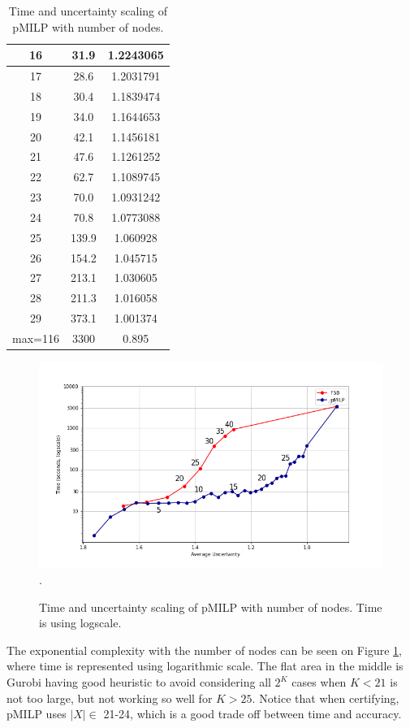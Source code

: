 \begin{table}[h!]
\begin{subtable}[b]{0.45\textwidth}
\begin{tabular}{|c|c|c|}
		\hline	16 & 31.9 & 1.2243065\\
		\hline	17 & 28.6 & 1.2031791\\
		\hline	18 & 30.4 & 1.1839474\\
		\hline	19 & 34.0 & 1.1644653\\
		\hline	20 & 42.1 & 1.1456181\\
		\hline	21 & 47.6 & 1.1261252\\
		\hline	22 & 62.7 & 1.1089745\\
		\hline	23 & 70.0 & 1.0931242\\
		\hline	24 & 70.8 & 1.0773088\\
		\hline	25 & 139.9 & 1.060928\\
		\hline	26 & 154.2 & 1.045715\\
		\hline	27 & 213.1 & 1.030605 \\
		\hline	28 & 211.3 & 1.016058\\
		\hline	29 & 373.1 & 1.001374\\
		\hline max=116 & 3300 & 0.895\\ 
		\hline		
	  \end{tabular}
     \end{subtable}
	  \caption{Time and uncertainty scaling of pMILP with number of nodes.}
    	\label{table14}
\end{table}


\begin{figure}[b!]
	\hspace*{-0.8cm}
	\includegraphics[scale=0.6]{Layer3_comparison}.
	\caption{Time and uncertainty scaling of pMILP with number of nodes.
	Time is using logscale.}
	\label{fig3}
\end{figure}


The exponential complexity with the number of nodes can be seen on Figure \ref{fig3}, where time is represented using logarithmic scale. The flat area in the middle is Gurobi having good heuristic to avoid considering all $2^K$ cases when $K<21$ is not too large, but not working so well for $K>25$. Notice that when certifying, pMILP uses $|X| \in$ 21-24, which is a good trade off between time and accuracy.

